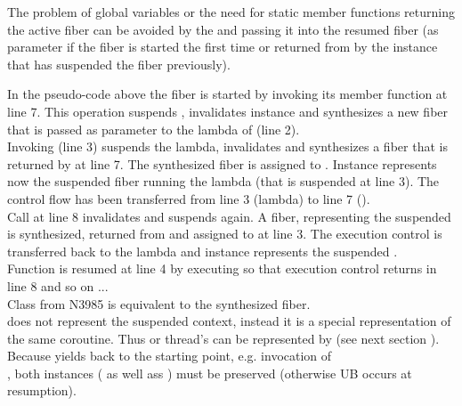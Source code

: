 \label{solution_gpub}


\label{synthesizing}
The problem of global variables or the need for static member functions
returning the active fiber can be avoided by  the
 and passing it into the resumed fiber (as parameter if the
fiber is started the first time or returned from \resume by the instance that
has suspended the fiber previously).

In the pseudo-code above the fiber  is started by invoking its member
function \resume at line 7. This operation suspends , invalidates
instance  and synthesizes a new fiber  that is passed as parameter
to the lambda of  (line 2).\\
Invoking  (line 3) suspends the lambda, invalidates  and
synthesizes a fiber that is returned by  at line 7. The
synthesized fiber is assigned to . Instance  represents now the
suspended fiber running the lambda (that is suspended at line 3). The control
flow has been transferred from line 3 (lambda) to line 7 ().\\
Call  at line 8 invalidates  and suspends 
again. A fiber, representing the suspended  is synthesized, returned
from  and assigned to  at line 3. The execution control
is transferred back to the lambda and instance  represents the suspended
.\\
Function  is resumed at line 4 by executing  so that
execution control returns in line 8 and so on ...\\

Class  from  N3985\cite{N3985} is
 equivalent to the synthesized fiber.\\
 does not represent the suspended context,
instead it is a special representation of the same coroutine. Thus \main or
thread's \entryfn\xspace can  be represented by 
(see next section ).\\
Because  yields back to the starting
point, e.g. invocation of\\
,
both instances ( as well ass ) must be preserved
(otherwise UB occurs at resumption).\\

